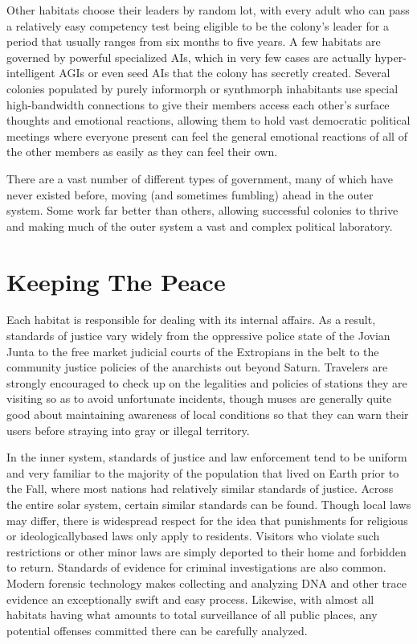 Other habitats choose their leaders by random 
lot, with every adult who can pass a relatively easy 
competency test being eligible to be the colony's 
leader for a period that usually ranges from six 
months to five years. A few habitats are governed 
by powerful specialized AIs, which in very few 
cases are actually hyper-intelligent AGIs or even 
seed AIs that the colony has secretly created. Several colonies populated by purely informorph or 
synthmorph inhabitants use special high-bandwidth 
connections to give their members access each 
other's surface thoughts and emotional reactions, 
allowing them to hold vast democratic political 
meetings where everyone present can feel the general emotional reactions of all of the other members 
as easily as they can feel their own.

There are a vast number of different types of government, many of which have never existed before, 
moving (and sometimes fumbling) ahead in the outer 
system. Some work far better than others, allowing 
successful colonies to thrive and making much of the 
outer system a vast and complex political laboratory.

\section{Keeping The Peace}

Each habitat is responsible for dealing with its internal affairs. As a result, standards of justice vary 
widely from the oppressive police state of the Jovian 
Junta to the free market judicial courts of the Extropians in the belt to the community justice policies 
of the anarchists out beyond Saturn. Travelers are 
strongly encouraged to check up on the legalities and 
policies of stations they are visiting so as to avoid 
unfortunate incidents, though muses are generally 
quite good about maintaining awareness of local 
conditions so that they can warn their users before 
straying into gray or illegal territory.

In the inner system, standards of justice and law enforcement tend to be uniform and very familiar to the 
majority of the population that lived on Earth prior 
to the Fall, where most nations had relatively similar 
standards of justice. Across the entire solar system, 
certain similar standards can be found. Though local 
laws may differ, there is widespread respect for the 
idea that punishments for religious or ideologicallybased laws only apply to residents. Visitors who violate such restrictions or other minor laws are simply 
deported to their home and forbidden to return. 
Standards of evidence for criminal investigations are 
also common. Modern forensic technology makes collecting and analyzing DNA and other trace evidence 
an exceptionally swift and easy process. Likewise, 
with almost all habitats having what amounts to total 
surveillance of all public places, any potential offenses 
committed there can be carefully analyzed.

